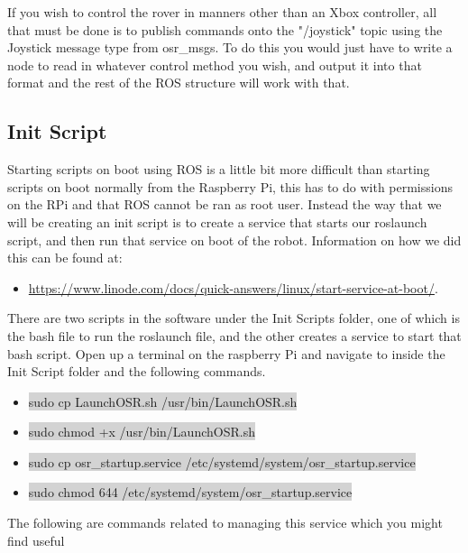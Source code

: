 \documentclass[12pt]{article}
\begin{document}
\bigskip 

\noindent If you wish to control the rover in manners other than an Xbox controller, all that must be done is to publish commands onto the "/joystick" topic using the Joystick message type from osr\_msgs. To do this you would just have to write a node to read in whatever control method you wish, and output it into that format and the rest of the ROS structure will work with that.

\subsection{Init Script}

Starting scripts on boot using ROS is a little bit more difficult than starting scripts on boot normally from the Raspberry Pi, this has to do with permissions on the RPi and that ROS cannot be ran as root user. Instead the way that we will be creating an init script is to create a service that starts our roslaunch script, and then run that service on boot of the robot. Information on how we did this can be found at: 

\begin{itemize}
	\item \href{https://www.linode.com/docs/quick-answers/linux/start-service-at-boot/}{https://www.linode.com/docs/quick-answers/linux/start-service-at-boot/}. 
\end{itemize}

There are two scripts in the software under the Init Scripts folder, one of which is the bash file to run the roslaunch file, and the other creates a service to start that bash script. Open up a terminal on the raspberry Pi and navigate to inside the Init Script folder and the following commands.

\begin{itemize}
	\item[] \colorbox{lightgray}{sudo cp LaunchOSR.sh /usr/bin/LaunchOSR.sh}
	\item[] \colorbox{lightgray}{sudo chmod +x /usr/bin/LaunchOSR.sh}
	\item[] \colorbox{lightgray}{sudo cp osr\_startup.service /etc/systemd/system/osr\_startup.service}
	\item[] \colorbox{lightgray}{sudo chmod 644 /etc/systemd/system/osr\_startup.service}
\end{itemize}

\noindent The following are commands related to managing this service which you might find useful
\end{document}
